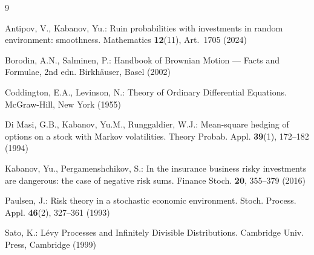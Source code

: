 \documentclass[smallextended]{svjour3}
\begin{document}
\begin{thebibliography}{9}

Antipov, V., Kabanov, Yu.: Ruin probabilities with investments in random
environment: smoothness. Mathematics \textbf{12}(11), Art.~1705 (2024)

Borodin, A.N., Salminen, P.: Handbook of Brownian Motion --- Facts and
Formulae, 2nd edn. Birkh\"auser, Basel (2002)

Coddington, E.A., Levinson, N.: Theory of Ordinary Differential Equations.
McGraw-Hill, New York (1955)

Di Masi, G.B., Kabanov, Yu.M., Runggaldier, W.J.: Mean-square hedging of
options on a stock with Markov volatilities. Theory Probab. Appl.
\textbf{39}(1), 172--182 (1994)

Kabanov, Yu., Pergamenshchikov, S.: In the insurance business risky
investments are dangerous: the case of negative risk sums. Finance Stoch.
\textbf{20}, 355--379 (2016)

Paulsen, J.: Risk theory in a stochastic economic environment. Stoch. Process.
Appl. \textbf{46}(2), 327--361 (1993)

Sato, K.: L\'evy Processes and Infinitely Divisible Distributions. Cambridge
Univ. Press, Cambridge (1999)

\end{thebibliography}
\end{document}
